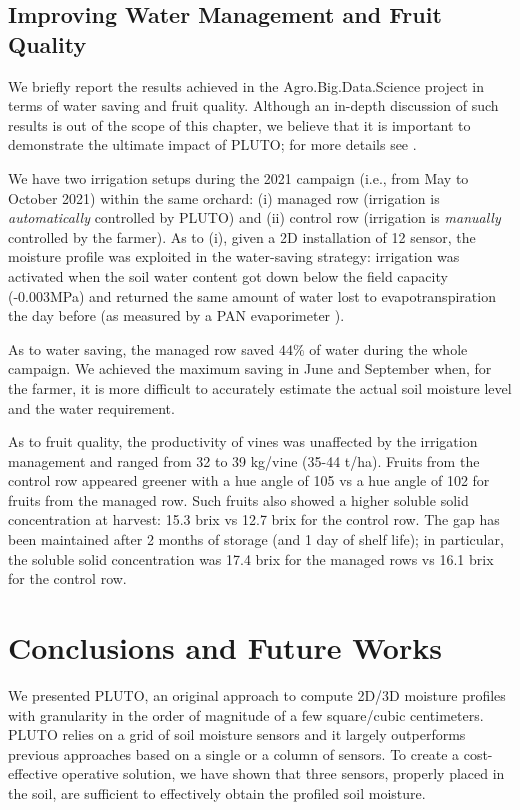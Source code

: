 \subsection{Improving Water Management and Fruit Quality}
\label{pluto-sec:FruitQuality}
We briefly report the results achieved in the Agro.Big.Data.Science project in terms of water saving and fruit quality. Although an in-depth discussion of such results is out of the scope of this chapter, we believe that it is important to demonstrate the ultimate impact of PLUTO; for more details see \cite{quartieri2021effect}. 

We have two irrigation setups during the 2021 campaign (i.e., from May to October 2021) within the same orchard: (i) managed row (irrigation is \textit{automatically} controlled by PLUTO) and (ii) control row (irrigation is \textit{manually} controlled by the farmer). As to (i), given a 2D installation of 12 sensor, the moisture profile was exploited in the water-saving strategy: irrigation was activated when the soil water content got down below the field capacity (-0.003MPa) and returned the same amount of water lost to evapotranspiration the day before (as measured by a PAN evaporimeter \cite{quartieri2021effect}).

As to water saving, the managed row saved $44\%$ of water during the whole campaign. We achieved the maximum saving in June and September when, for the farmer, it is more difficult to accurately estimate the actual soil moisture level and the water requirement.

As to fruit quality, the productivity of vines was unaffected by the irrigation management and ranged from 32 to 39 kg/vine (35-44 t/ha). Fruits from the control row appeared greener with a hue angle of 105 vs a hue angle of 102 for fruits from the managed row. Such fruits also showed a higher soluble solid concentration at harvest: 15.3 brix vs 12.7 brix for the control row. The gap has been maintained after 2 months of storage (and 1 day of shelf life); in particular, the soluble solid concentration was 17.4 brix for the managed rows vs 16.1 brix for the control row.


\section{Conclusions and Future Works}
\label{pluto-sec:conclusions}
We presented PLUTO, an original approach to compute 2D/3D moisture profiles with granularity in the order of magnitude of a few square/cubic centimeters.
PLUTO relies on a grid of soil moisture sensors and it largely outperforms previous approaches based on a single or a column of sensors.
To create a  cost-effective operative solution, we have shown that three sensors, properly placed in the soil, are sufficient %
to effectively obtain the profiled soil moisture.

